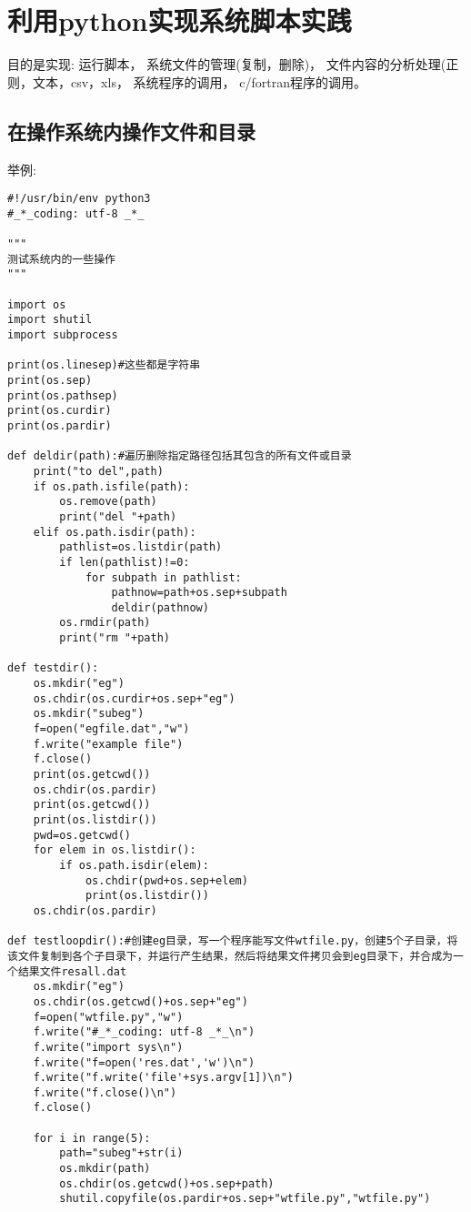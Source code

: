 \documentclass[twoside,11pt]{book}
\begin{document}
\chapter{利用python实现系统脚本实践}

目的是实现:
运行脚本，
系统文件的管理(复制，删除)，
文件内容的分析处理(正则，文本，csv，xls，
系统程序的调用，
c/fortran程序的调用。

\section{在操作系统内操作文件和目录}
举例:
\begin{lstlisting}
#!/usr/bin/env python3
#_*_coding: utf-8 _*_

"""
测试系统内的一些操作
"""

import os
import shutil
import subprocess

print(os.linesep)#这些都是字符串
print(os.sep)
print(os.pathsep)
print(os.curdir)
print(os.pardir)

def deldir(path):#遍历删除指定路径包括其包含的所有文件或目录
    print("to del",path)
    if os.path.isfile(path):
        os.remove(path)
        print("del "+path)
    elif os.path.isdir(path):
        pathlist=os.listdir(path)
        if len(pathlist)!=0:
            for subpath in pathlist:
                pathnow=path+os.sep+subpath
                deldir(pathnow)
        os.rmdir(path)
        print("rm "+path)

def testdir():
    os.mkdir("eg")
    os.chdir(os.curdir+os.sep+"eg")
    os.mkdir("subeg")
    f=open("egfile.dat","w")
    f.write("example file")
    f.close()
    print(os.getcwd())
    os.chdir(os.pardir)
    print(os.getcwd())
    print(os.listdir())
    pwd=os.getcwd()
    for elem in os.listdir():
        if os.path.isdir(elem):
            os.chdir(pwd+os.sep+elem)
            print(os.listdir())
    os.chdir(os.pardir)

def testloopdir():#创建eg目录，写一个程序能写文件wtfile.py，创建5个子目录，将该文件复制到各个子目录下，并运行产生结果，然后将结果文件拷贝会到eg目录下，并合成为一个结果文件resall.dat
    os.mkdir("eg")
    os.chdir(os.getcwd()+os.sep+"eg")
    f=open("wtfile.py","w")
    f.write("#_*_coding: utf-8 _*_\n")
    f.write("import sys\n")
    f.write("f=open('res.dat','w')\n")
    f.write("f.write('file'+sys.argv[1])\n")
    f.write("f.close()\n")
    f.close()

    for i in range(5):
        path="subeg"+str(i)
        os.mkdir(path)
        os.chdir(os.getcwd()+os.sep+path)
        shutil.copyfile(os.pardir+os.sep+"wtfile.py","wtfile.py")


\end{lstlisting}
\end{document}
